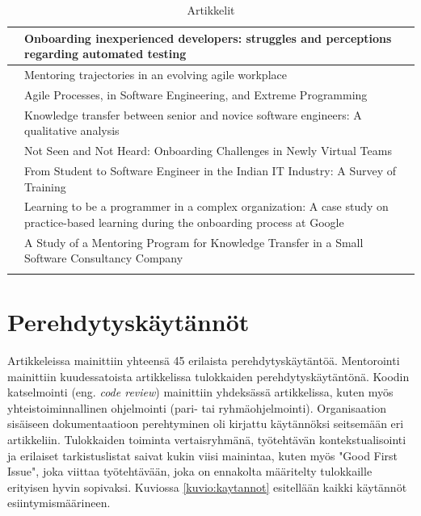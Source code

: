\documentclass[utf8]{gradu3}
\begin{document}
\begin{table}
\begin{tabular}{p{3.5cm}p{12cm}}
\midrule
\textcite{pham-ym-2017} & Onboarding inexperienced developers: struggles and perceptions regarding automated testing \\

\midrule
\textcite{kumar-ym-2016} & Mentoring trajectories in an evolving agile workplace \\

\midrule
\textcite{shannon-pool-2016} & Agile Processes, in Software Engineering, and Extreme Programming \\

\midrule
\textcite{viana-ym-2014} & Knowledge transfer between senior and novice software engineers: A qualitative analysis \\

\midrule
\textcite{hemphill-begel-2011} & Not Seen and Not Heard: Onboarding Challenges in Newly Virtual Teams \\

\midrule
\textcite{kulkarni-ym-2010} & From Student to Software Engineer in the Indian IT Industry: A Survey of Training \\

\midrule
 \textcite{johnson-senges-2010} & Learning to be a programmer in a complex organization: A case study on practice-based learning during the onboarding process at Google\\

\midrule
\textcite{bjornson-dingsøyr-2005} & A Study of a Mentoring Program for Knowledge Transfer in a Small Software Consultancy Company \\

\bottomrule
\label{tbl:artikkelit}
\end{tabular}
\caption{Artikkelit}
\end{table}

\section{Perehdytyskäytännöt}

Artikkeleissa mainittiin yhteensä 45 erilaista perehdytyskäytäntöä. Mentorointi mainittiin kuudessatoista artikkelissa tulokkaiden perehdytyskäytäntönä. Koodin katselmointi (eng. \textit{code review}) mainittiin yhdeksässä artikkelissa, kuten myös yhteistoiminnallinen ohjelmointi (pari- tai ryhmäohjelmointi). Organisaation sisäiseen dokumentaatioon perehtyminen oli kirjattu käytännöksi seitsemään eri artikkeliin. Tulokkaiden toiminta vertaisryhmänä, työtehtävän kontekstualisointi ja erilaiset tarkistuslistat saivat kukin viisi mainintaa, kuten myös "Good First Issue", joka viittaa työtehtävään, joka on ennakolta määritelty tulokkaille erityisen hyvin sopivaksi. Kuviossa \ref{kuvio:kaytannot} esitellään kaikki käytännöt esiintymismäärineen.
\end{document}
